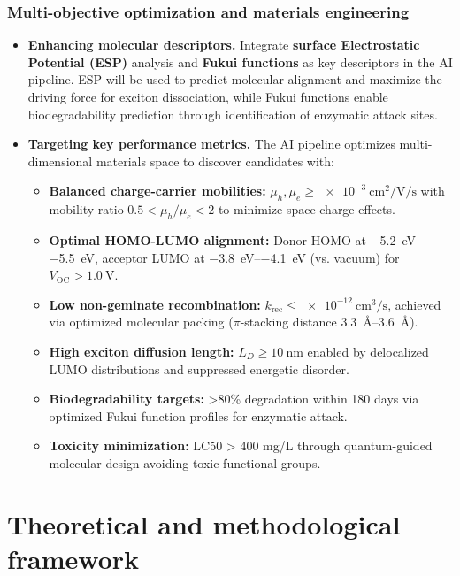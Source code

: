 \documentclass[12pt, a4paper]{article}
\begin{document}
\subsubsection{Multi-objective optimization and materials engineering}
\begin{itemize}
    \item \textbf{Enhancing molecular descriptors.} Integrate \textbf{surface Electrostatic Potential (ESP)} analysis and \textbf{Fukui functions} as key descriptors in the AI pipeline. ESP will be used to predict molecular alignment and maximize the driving force for exciton dissociation, while Fukui functions enable biodegradability prediction through identification of enzymatic attack sites.

    \item \textbf{Targeting key performance metrics.} The AI pipeline optimizes multi-dimensional materials space to discover candidates with:
    \begin{itemize}
        \item \textbf{Balanced charge-carrier mobilities:} $\mu_h, \mu_e \geq \SI{e-3}{\centi\meter\squared\per\volt\per\second}$ with mobility ratio $0.5 < \mu_h/\mu_e < 2$ to minimize space-charge effects.
        \item \textbf{Optimal HOMO-LUMO alignment:} Donor HOMO at \SIrange{-5.2}{-5.5}{\electronvolt}, acceptor LUMO at \SIrange{-3.8}{-4.1}{\electronvolt} (vs. vacuum) for $V_{\text{OC}} > \SI{1.0}{\volt}$.
        \item \textbf{Low non-geminate recombination:} $k_{\text{rec}} \leq \SI{e-12}{\centi\meter\cubed\per\second}$, achieved via optimized molecular packing ($\pi$-stacking distance \SIrange{3.3}{3.6}{\angstrom}).
        \item \textbf{High exciton diffusion length:} $L_D \geq \SI{10}{\nano\meter}$ enabled by delocalized LUMO distributions and suppressed energetic disorder.
        \item \textbf{Biodegradability targets:} >80\% degradation within 180 days via optimized Fukui function profiles for enzymatic attack.
        \item \textbf{Toxicity minimization:} LC50 > 400 mg/L through quantum-guided molecular design avoiding toxic functional groups.
    \end{itemize}
\end{itemize}

\section{Theoretical and methodological framework}
\label{sec:methodology}
\end{document}
